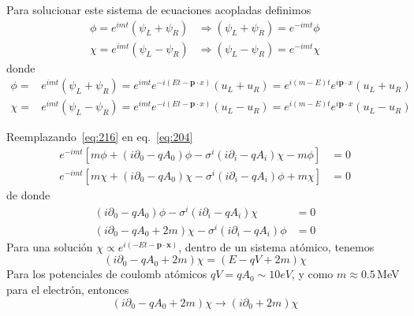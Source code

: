 Para solucionar este sistema de ecuaciones acopladas definimos
\begin{align}
  \label{eq:216}
  \phi=e^{i m t}(\psi_L+\psi_R)&\Rightarrow(\psi_L+\psi_R)=e^{-i m t}\phi\nonumber\\
  \chi=e^{i m t}(\psi_L-\psi_R)&\Rightarrow(\psi_L-\psi_R)=e^{-i m t}\chi
\end{align}
donde
\begin{align}
\label{eq:260}
    \phi=&e^{i m t}(\psi_L+\psi_R)=e^{i m t}e^{-i (Et-\mathbf{p}\cdot x)}(u_L+u_R)=e^{i(m-E)t}e^{i\mathbf{p}\cdot x}(u_L+u_R)\nonumber\\
    \chi=&e^{i m t}(\psi_L-\psi_R)=e^{i m t}e^{-i (Et-\mathbf{p}\cdot x)}(u_L-u_R)=e^{i(m-E)t}e^{i\mathbf{p}\cdot x}(u_L-u_R)
\end{align}

Reemplazando~\eqref{eq:216} en eq.~\eqref{eq:204}
\begin{align}
  e^{-i m t}[m\phi+(i\partial_0- q A_0)\phi-{\sigma}^i(i\partial_i-q A_i)\chi-m\phi]  &=0\nonumber\\
  e^{-i m t}[m\chi+(i\partial_0-q A_0)\chi-{\sigma}^i(i\partial_i-q A_i)\phi+m\chi]  &=0
\end{align}
de donde
\begin{align}
  \label{eq:205}
  (i\partial_0- q A_0)\phi-{\sigma}^i(i\partial_i-q A_i)\chi  &=0\nonumber\\
  (i\partial_0-q A_0+2m)\chi-{\sigma}^i(i\partial_i-q A_i)\phi  &=0
\end{align}
Para una soluci\'on $\chi\propto e^{i(-Et-\mathbf{p}\cdot \mathbf{x})}$, dentro de un sistema at\'omico,  tenemos
\begin{equation}
  (i\partial_0-q A_0+2m)\chi=(E-q V+2m)\chi
\end{equation}
Para los potenciales de coulomb at\'omicos $qV=qA_0\sim10 eV$, y como $m\approx0.5\,$MeV para el electr\'on, entonces
\begin{equation}
  (i\partial_0-q A_0+2m)\chi\to(i\partial_0+2m)\chi
\end{equation}

